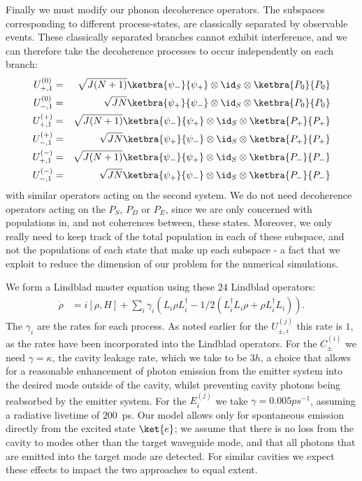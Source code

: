 Finally we must modify our phonon decoherence operators. The subspaces corresponding to different process-states, are classically separated by observable events. These classically separated branches cannot exhibit interference, and we can therefore take the decoherence processes to occur independently on each branch:
\begin{eqnarray}
  U_{+,1}^{(0)} &=& \sqrt{J(N+1)}\ketbra{\psi_-}{\psi_+} \otimes \id_S \otimes \ketbra{P_0}{P_0}\\
  U_{-,1}^{(0)} &=& \sqrt{JN}\ketbra{\psi_+}{\psi_-} \otimes \id_S \otimes \ketbra{P_0}{P_0}\\
  U_{+,1}^{(+)} &=& \sqrt{J(N+1)}\ketbra{\psi_-}{\psi_+} \otimes \id_S \otimes \ketbra{P_+}{P_+}\\
  U_{-,1}^{(+)} &=& \sqrt{JN}\ketbra{\psi_+}{\psi_-} \otimes \id_S \otimes \ketbra{P_+}{P_+}\\
  U_{+,1}^{(-)} &=& \sqrt{J(N+1)}\ketbra{\psi_-}{\psi_+} \otimes \id_S \otimes \ketbra{P_-}{P_-}\\
  U_{-,1}^{(-)} &=& \sqrt{JN}\ketbra{\psi_+}{\psi_-} \otimes \id_S \otimes \ketbra{P_-}{P_-}
\end{eqnarray}  
with similar operators acting on the second system. We do not need decoherence operators acting on the $P_S$, $P_D$ or $P_E$, since we are only concerned with populations in, and not coherences between, these states. Moreover, we only really need to keep track of the total population in each of these subspace, and not the populations of each state that make up each subspace - a fact that we exploit to reduce the dimension of our problem for the numerical simulations.

We form a Lindblad master equation using these $24$ Lindblad operators:
\begin{eqnarray}
  \dot{\rho} &= i\left[ \rho, H \right] + \sum_i \gamma_i \left( L_i\rho L_i^\dagger - 1/2(L_i^\dagger L_i\rho + \rho L_i^\dagger L_i) \right).
\end{eqnarray}
The $\gamma_i$ are the rates for each process. As noted earlier for the $U_{\pm, i}^{(j)}$ this rate is $1$, as the rates have been incorporated into the Lindblad operators. For the $C_\pm^{(i)}$ we need $\gamma = \kappa$, the cavity leakage rate, which we take to be $3h$, a choice that allows for a reasonable enhancement of photon emission from the emitter system into the desired mode outside of the cavity, whilst preventing cavity photons being reabsorbed by the emitter system. For the $E_i^{(j)}$ we take $\gamma = 0.005ps^{-1}$, assuming a radiative livetime of $200$~ps. Our model allows only for spontaneous emission directly from the excited state $\ket{e}$; we assume that there is no loss from the cavity to modes other than the target waveguide mode, and that all photons that are emitted into the target mode are detected. For similar cavities we expect these effects to impact the two approaches to equal extent. 

